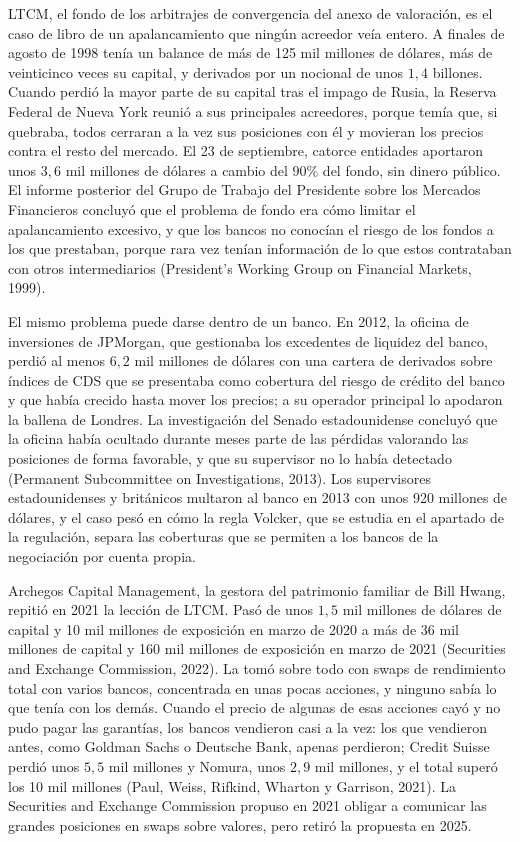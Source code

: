 \documentclass[10pt,a4paper]{article}
\newcounter{anexo}
\begin{document}
LTCM, el fondo de los arbitrajes de convergencia del anexo de valoración, es el caso de libro de un apalancamiento que ningún acreedor veía entero. A finales de agosto de 1998 tenía un balance de más de 125 mil millones de dólares, más de veinticinco veces su capital, y derivados por un nocional de unos $1{,}4$ billones. Cuando perdió la mayor parte de su capital tras el impago de Rusia, la Reserva Federal de Nueva York reunió a sus principales acreedores, porque temía que, si quebraba, todos cerraran a la vez sus posiciones con él y movieran los precios contra el resto del mercado. El 23 de septiembre, catorce entidades aportaron unos $3{,}6$ mil millones de dólares a cambio del $90\%$ del fondo, sin dinero público. El informe posterior del Grupo de Trabajo del Presidente sobre los Mercados Financieros concluyó que el problema de fondo era cómo limitar el apalancamiento excesivo, y que los bancos no conocían el riesgo de los fondos a los que prestaban, porque rara vez tenían información de lo que estos contrataban con otros intermediarios (President's Working Group on Financial Markets, 1999).

El mismo problema puede darse dentro de un banco. En 2012, la oficina de inversiones de JPMorgan, que gestionaba los excedentes de liquidez del banco, perdió al menos $6{,}2$ mil millones de dólares con una cartera de derivados sobre índices de CDS que se presentaba como cobertura del riesgo de crédito del banco y que había crecido hasta mover los precios; a su operador principal lo apodaron la ballena de Londres. La investigación del Senado estadounidense concluyó que la oficina había ocultado durante meses parte de las pérdidas valorando las posiciones de forma favorable, y que su supervisor no lo había detectado (Permanent Subcommittee on Investigations, 2013). Los supervisores estadounidenses y británicos multaron al banco en 2013 con unos 920 millones de dólares, y el caso pesó en cómo la regla Volcker, que se estudia en el apartado de la regulación, separa las coberturas que se permiten a los bancos de la negociación por cuenta propia.

Archegos Capital Management, la gestora del patrimonio familiar de Bill Hwang, repitió en 2021 la lección de LTCM. Pasó de unos $1{,}5$ mil millones de dólares de capital y 10 mil millones de exposición en marzo de 2020 a más de 36 mil millones de capital y 160 mil millones de exposición en marzo de 2021 (Securities and Exchange Commission, 2022). La tomó sobre todo con swaps de rendimiento total con varios bancos, concentrada en unas pocas acciones, y ninguno sabía lo que tenía con los demás. Cuando el precio de algunas de esas acciones cayó y no pudo pagar las garantías, los bancos vendieron casi a la vez: los que vendieron antes, como Goldman Sachs o Deutsche Bank, apenas perdieron; Credit Suisse perdió unos $5{,}5$ mil millones y Nomura, unos $2{,}9$ mil millones, y el total superó los 10 mil millones (Paul, Weiss, Rifkind, Wharton y Garrison, 2021). La Securities and Exchange Commission propuso en 2021 obligar a comunicar las grandes posiciones en swaps sobre valores, pero retiró la propuesta en 2025.
\end{document}
